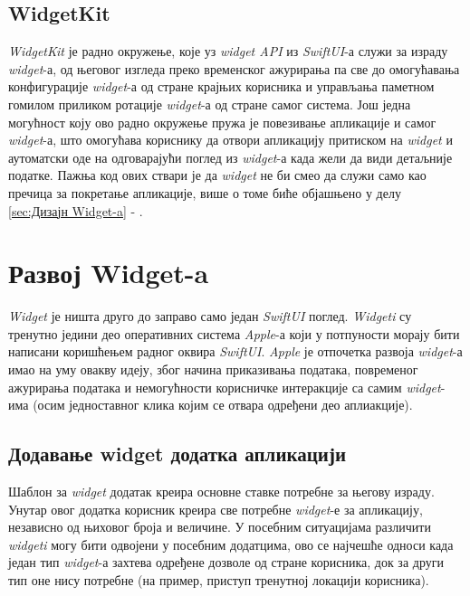 \documentclass[12pt,oneside]{memoir}
\begin{document}
\subsection{WidgetKit}
\indent \textit{WidgetKit} је радно окружење, које уз \textit{widget API} из  \textit{SwiftUI}-а служи за израду \textit{widget}-а, од његовог изгледа преко временског ажурирања па све до омогућавања конфигурације \textit{widget}-а од стране крајњих корисника и управљања паметном гомилом приликом ротације \textit{widget}-а од стране самог система. Још једна могућност коју ово радно окружење пружа је повезивање апликације и самог \textit{widget}-а, што омогућава кориснику да отвори апликацију притиском на \textit{widget} и аутоматски оде на одговарајући поглед из \textit{widget}-а када жели да види детаљније податке. Пажња код ових ствари је да \textit{widget} не би смео да служи само као пречица за покретање апликације, више о томе биће објашњено у делу \ref{sec:Дизајн Widget-a} - .

\section{Развој Widget-a}
\label{sec:Развој Widget-a}
\indent \textit{Widget} је ништа друго до заправо само један \textit{SwiftUI} поглед. \textit{Widgeti} су тренутно једини део оперативних система \textit{Apple}-а који у потпуности морају бити написани коришћењем радног оквира \textit{SwiftUI}. \textit{Apple} је отпочетка развоја \textit{widget}-а имао на уму овакву идеју, због начина приказивања података, повременог ажурирања података и немогућности корисничке интеракције са самим \textit{widget}-има (осим једноставног клика којим се отвара одређени део аплиакције).

\subsection{Додавање widget додатка апликацији}
\indent Шаблон за \textit{widget} додатак креира основне ставке потребне за његову израду. Унутар овог додатка корисник креира све потребне \textit{widget}-е за апликацију, независно од њиховог броја и величине. У посебним ситуацијама различити \textit{widgeti} могу бити одвојени у посебним додатцима, ово се најчешће односи када један тип \textit{widget}-а захтева одређене дозволе од стране корисника, док за други тип оне нису потребне (на пример, приступ тренутној локацији корисника).
\end{document}
